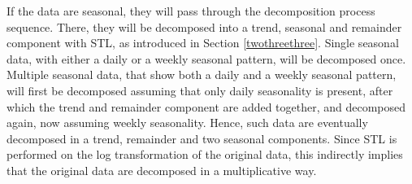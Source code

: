 \documentclass[12pt,oneside]{reedthesis}
\begin{document}
If the data are seasonal, they will pass through the decomposition
process sequence. There, they will be decomposed into a trend, seasonal
and remainder component with STL, as introduced in Section
\ref{twothreethree}. Single seasonal data, with either a daily or a
weekly seasonal pattern, will be decomposed once. Multiple seasonal
data, that show both a daily and a weekly seasonal pattern, will first
be decomposed assuming that only daily seasonality is present, after
which the trend and remainder component are added together, and
decomposed again, now assuming weekly seasonality. Hence, such data are
eventually decomposed in a trend, remainder and two seasonal components.
Since STL is performed on the log transformation of the original data,
this indirectly implies that the original data are decomposed in a
multiplicative way.
\end{document}
